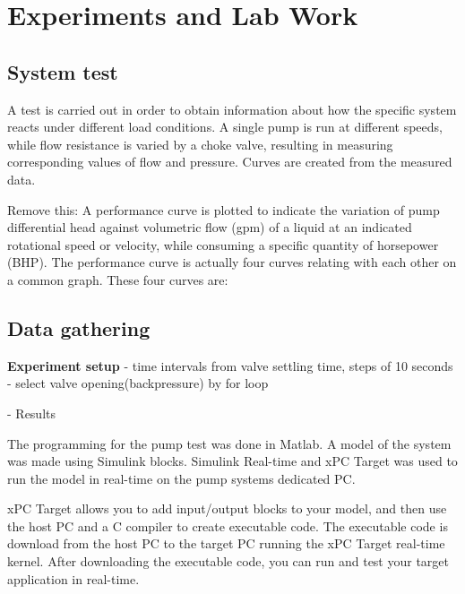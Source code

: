 \chapter{Experiments and Lab Work}\label{ch:experiment} 
\section{System test}\label{sec:system_test} 
A test is carried out in order to obtain information about how the specific 
system reacts under different load conditions. A single pump is run at 
different speeds, while flow resistance is varied by a choke valve, resulting 
in measuring corresponding values of flow and pressure. Curves are created 
from the measured data.

Remove this:
A performance curve is plotted to indicate the variation of pump differential head against volumetric flow (gpm) of a liquid at an indicated rotational speed or velocity, while consuming a specific quantity of horsepower (BHP). The performance curve is actually four curves relating with each other on a common graph. These four curves are:

\section{Data gathering}\label{sec:data_gathering} 
\textbf{Experiment setup}
- time intervals from valve settling time, steps of 10 seconds
- select valve opening(backpressure) by for loop


- Results

The programming for the pump test was done in Matlab. 
A model of the system was made using Simulink blocks. 
Simulink Real-time and xPC Target was used to run the model in real-time 
on the pump systems dedicated PC. 


xPC Target allows you to add input/output blocks to your model, and then use the host 
PC and a C compiler to create executable code. The executable code is download 
from the host PC to the target PC running the xPC Target real-time kernel. 
After downloading the executable code, you can run and test your target 
application in real-time. 



 